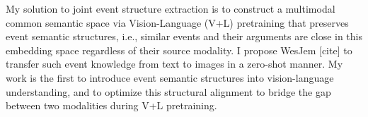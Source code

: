 



 My solution to joint event structure extraction is to construct a multimodal common semantic
space via Vision-Language (V+L) pretraining that preserves event semantic structures, i.e., similar
events and their arguments are close in this embedding space regardless of their source modality. I propose WesJem [cite] to transfer such event knowledge from text to images in a
zero-shot manner. My work is the first to introduce event semantic structures into vision-language understanding, and to optimize this structural alignment to bridge the gap between two modalities
during V+L pretraining.